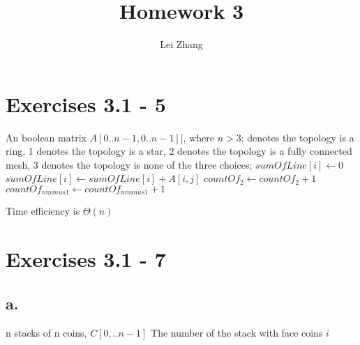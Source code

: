 \documentclass{article}
\title{Homework 3}
\author{Lei Zhang}
\begin{document}
\maketitle

\section{Exercises 3.1 - 5}

\begin{center}
\begin{algorithmic}
\INPUT
An boolean matrix $A[0..n-1,0..n-1]]$, where $n > 3$;
 denotes the topology is a ring,
1 denotes the topology is a star,
2 denotes the topology is a fully connected mesh,
3 denotes the topology is none of the three choices;
\State $sumOfLine[i] \leftarrow 0$
\EndFor
{}
\State $sumOfLine[i] \leftarrow sumOfLine[i] + A[i,j]$
\EndFor
\EndFor
{}
\State $countOf_2 \leftarrow countOf_2 + 1$
\EndIf
\EndFor
{}
\State $countOf_{nminus1} \leftarrow countOf_{nminus1} + 1$
\EndIf
\EndFor
{}
\State {}
\EndIf
{}
\State {}
\EndIf
{}
\State {}
\EndIf
\State {}
\end{algorithmic}
\end{center}

Time efficiency is $\Theta(n)$

\section{Exercises 3.1 - 7}

\subsection*{a.}

\begin{center}
\begin{algorithmic}
\INPUT
n stacks of n coins, $C[0,..n-1]$
\OUTPUT
The number of the stack with face coins
\State \Return $i$
\EndIf
\EndFor
\end{algorithmic}
\end{center}
\end{document}
